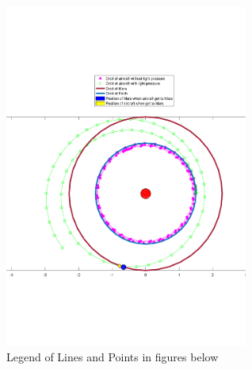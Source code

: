 \documentclass[../Paper.tex]{subfiles}
\begin{document}

\begin{figure}[H]
\centering
\includegraphics[width=8cm]{../Figures/label_of_7_orbits.pdf}
\caption{Legend of Lines and Points in figures below}
\end{figure}
\end{document}
